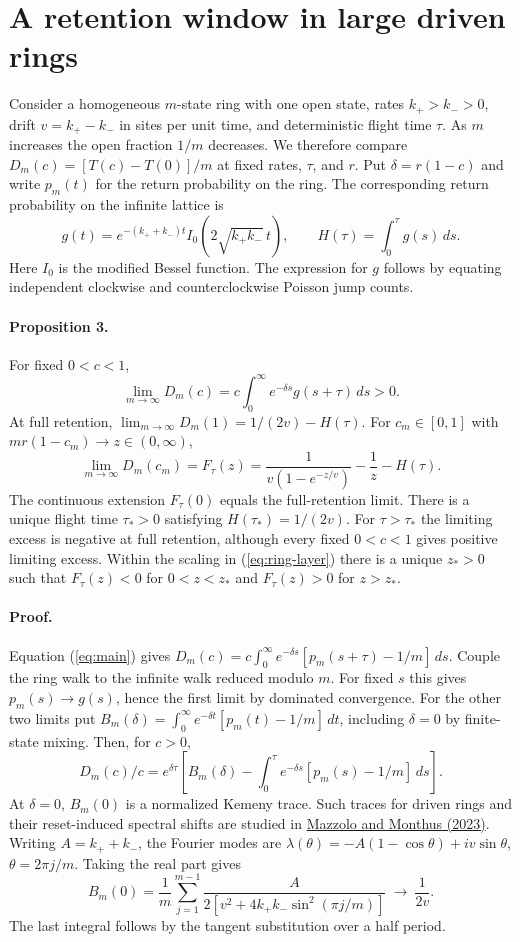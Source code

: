 \section{A retention window in large driven rings}\label{sec:layer}
Consider a homogeneous $m$-state ring with one open state, rates $k_+>k_->0$,
drift $v=k_+-k_-$ in sites per unit time, and deterministic flight time $\tau$.
As $m$ increases the open fraction $1/m$ decreases. We therefore compare
$D_m(c)=[T(c)-T(0)]/m$ at fixed rates, $\tau$, and $r$.
Put $\delta=r(1-c)$ and write $p_m(t)$ for the return probability on the
ring. The corresponding return probability on the infinite lattice is
\[
 g(t)=e^{-(k_++k_-)t}I_0(2\sqrt{k_+k_-}\,t),
 \qquad H(\tau)=\int_0^\tau g(s)\,ds.
\]
Here $I_0$ is the modified Bessel function. The expression for $g$ follows
by equating independent clockwise and counterclockwise Poisson jump counts.

\paragraph{Proposition 3.}
For fixed $0<c<1$,
\[
 \lim_{m\to\infty}D_m(c)=c\int_0^\infty e^{-\delta s}g(s+\tau)\,ds>0 .
\]
At full retention, $\lim_{m\to\infty}D_m(1)=1/(2v)-H(\tau)$.
For $c_m\in[0,1]$ with $mr(1-c_m)\to z\in(0,\infty)$,
\begin{equation}
 \lim_{m\to\infty}D_m(c_m)=
 F_\tau(z)=\frac{1}{v(1-e^{-z/v})}-\frac{1}{z}-H(\tau).
 \label{eq:ring-layer}
\end{equation}
The continuous extension $F_\tau(0)$ equals the full-retention limit.
There is a unique flight time $\tau_*>0$ satisfying
$H(\tau_*)=1/(2v)$. For $\tau>\tau_*$ the limiting excess is negative at
full retention, although every fixed $0<c<1$ gives positive limiting excess.
Within the scaling in (\ref{eq:ring-layer}) there is a unique $z_*>0$
such that $F_\tau(z)<0$ for $0<z<z_*$ and $F_\tau(z)>0$ for $z>z_*$.

\paragraph{Proof.}
Equation (\ref{eq:main}) gives
$D_m(c)=c\int_0^\infty e^{-\delta s}[p_m(s+\tau)-1/m]\,ds$.
Couple the ring walk to the infinite walk reduced modulo $m$. For fixed $s$
this gives $p_m(s)\to g(s)$, hence the first limit by dominated convergence.
For the other two limits put
$B_m(\delta)=\int_0^\infty e^{-\delta t}[p_m(t)-1/m]\,dt$, including
$\delta=0$ by finite-state mixing. Then, for $c>0$,
\[
 D_m(c)/c=e^{\delta\tau}
 \left[B_m(\delta)-\int_0^\tau e^{-\delta s}[p_m(s)-1/m]\,ds\right].
\]
At $\delta=0$, $B_m(0)$ is a normalized Kemeny trace. Such traces for
driven rings and their reset-induced spectral shifts are studied in
\href{https://arxiv.org/abs/2302.09965}{Mazzolo and Monthus (2023)}.
Writing $A=k_++k_-$, the Fourier modes are
$\lambda(\theta)=-A(1-\cos\theta)+iv\sin\theta$, $\theta=2\pi j/m$.
Taking the real part gives
\[
 B_m(0)=\frac{1}{m}\sum_{j=1}^{m-1}
 \frac{A}{2[v^2+4k_+k_-\sin^2(\pi j/m)]}
 \ \longrightarrow\ \frac{1}{2v}.
\]
The last integral follows by the tangent substitution over a half period.

